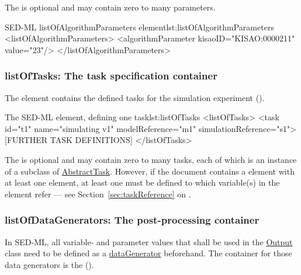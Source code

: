 The  is optional and may contain zero to many parameters. 

\begin{myXmlLst}{SED-ML listOfAlgorithmParameters element}{lst:listOfAlgorithmParameters}
<listOfAlgorithmParameters>
  <algorithmParameter kisaoID="KISAO:0000211" value="23"/> 
</listOfAlgorithmParameters>
\end{myXmlLst}

 
\subsubsection{listOfTasks: The task specification container}
\label{sec:listOfTasks}
The  element contains the defined tasks for the simulation experiment ().



\begin{myXmlLst}{The SED-ML  element, defining one task}{lst:listOfTasks}
<listOfTasks>
 <task id="t1" name="simulating v1" modelReference="m1" simulationReference="s1">
 [FURTHER TASK DEFINITIONS]
</listOfTasks>
\end{myXmlLst}

The  is optional and may contain zero to many tasks, each of which is an instance of a subclass of \hyperref[class:abstractTask]{AbstractTask}.
However, if the \currentLV document contains a  element with at least one  element, at least one  must be defined to which variable(s) in the  element refer --- see Section~\ref{sec:taskReference} on .


\subsubsection{listOfDataGenerators: The post-processing container}
\label{sec:listOfDataGenerators}

In SED-ML, all variable- and parameter values that shall be used in the \hyperref[class:output]{Output} class need to be defined as a \hyperref[class:dataGenerator]{dataGenerator} beforehand. The container for those data generators is the  (). 

